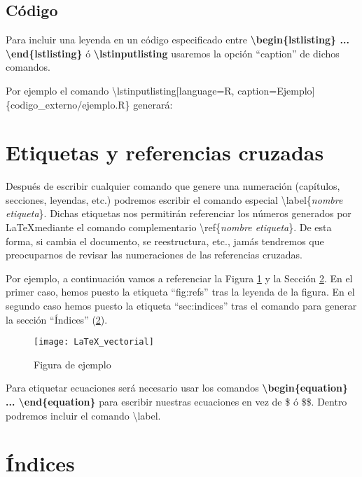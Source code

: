 \subsection{Código}

Para incluir una leyenda en un código especificado entre \textbf{\textbackslash begin\{lstlisting\} ... \textbackslash end\{lstlisting\}} ó \textbf{\textbackslash lstinputlisting} usaremos la opción ``caption'' de dichos comandos.

Por ejemplo el comando \textbackslash lstinputlisting[language=R, caption=Ejemplo] \{codigo\_externo/ejemplo.R\} generará:



\section{Etiquetas y referencias cruzadas}

Después de escribir cualquier comando que genere una numeración (capítulos, secciones, leyendas, etc.) podremos escribir el comando especial \textbackslash label\{\emph{nombre etiqueta}\}. Dichas etiquetas nos permitirán referenciar los números generados por \LaTeX mediante el comando complementario \textbackslash ref\{\emph{nombre etiqueta}\}. De esta forma, si cambia el documento, se reestructura, etc., jamás tendremos que preocuparnos de revisar las numeraciones de las referencias cruzadas.

Por ejemplo, a continuación vamos a referenciar la Figura \ref{fig:refs} y la Sección \ref{sec:indices}. En el primer caso, hemos puesto la etiqueta ``fig:refs'' tras la leyenda de la figura. En el segundo caso hemos puesto la etiqueta ``sec:indices'' tras el comando para generar la sección ``Índices'' (\ref{sec:indices}).

\begin{figure}[h]
	\centering
	\texttt{[image: LaTeX\_vectorial]}
	\caption{Figura de ejemplo}	
	\label{fig:refs}
\end{figure}

Para etiquetar ecuaciones será necesario usar los comandos \textbf{\textbackslash begin\{equation\} ... \textbackslash end\{equation\}} para escribir nuestras ecuaciones en vez de \$ ó \$\$. Dentro podremos incluir el comando \textbackslash label.

\section{Índices}
\label{sec:indices}

